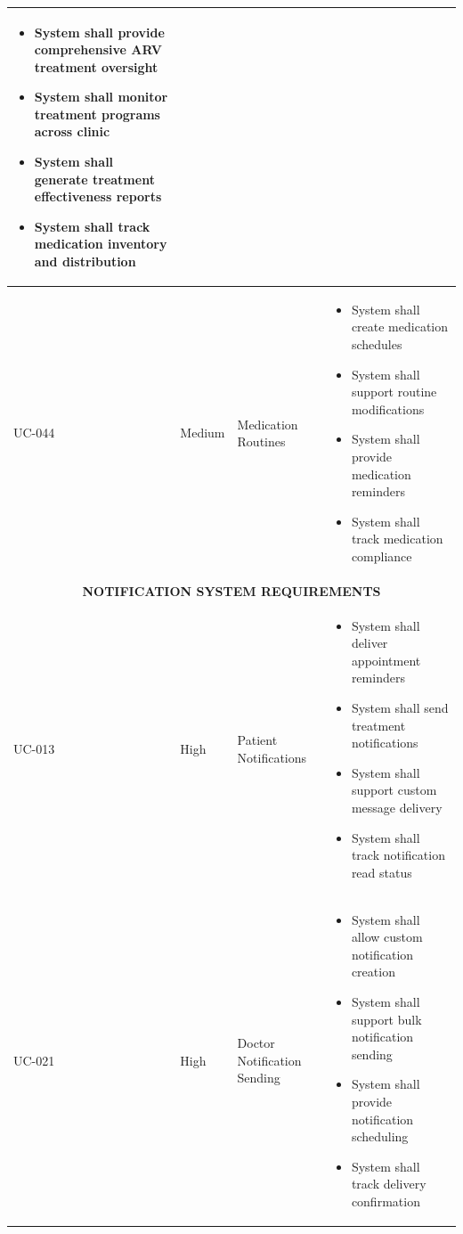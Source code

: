 \documentclass[12pt,a4paper]{article}
\begin{document}
\begin{longtable}{|p{1.2cm}|p{2.5cm}|p{3.5cm}|p{6.8cm}|}
\begin{itemize}[leftmargin=*,topsep=1pt,partopsep=0pt,parsep=0pt,itemsep=1pt]
\item System shall provide comprehensive ARV treatment oversight
\item System shall monitor treatment programs across clinic
\item System shall generate treatment effectiveness reports
\item System shall track medication inventory and distribution
\end{itemize} \\
\hline
UC-044 & Medium & Medication Routines & 
\begin{itemize}[leftmargin=*,topsep=1pt,partopsep=0pt,parsep=0pt,itemsep=1pt]
\item System shall create medication schedules
\item System shall support routine modifications
\item System shall provide medication reminders
\item System shall track medication compliance
\end{itemize} \\
\hline
\multicolumn{4}{|c|}{\textbf{NOTIFICATION SYSTEM REQUIREMENTS}} \\
\hline
UC-013 & High & Patient Notifications & 
\begin{itemize}[leftmargin=*,topsep=1pt,partopsep=0pt,parsep=0pt,itemsep=1pt]
\item System shall deliver appointment reminders
\item System shall send treatment notifications
\item System shall support custom message delivery
\item System shall track notification read status
\end{itemize} \\
\hline
UC-021 & High & Doctor Notification Sending & 
\begin{itemize}[leftmargin=*,topsep=1pt,partopsep=0pt,parsep=0pt,itemsep=1pt]
\item System shall allow custom notification creation
\item System shall support bulk notification sending
\item System shall provide notification scheduling
\item System shall track delivery confirmation
\end{itemize} \\

\end{longtable}
\end{document}
